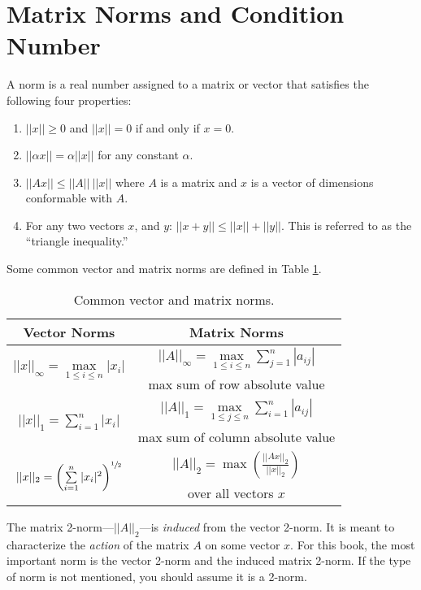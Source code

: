 \section{Matrix Norms and Condition Number}
A norm is a real number assigned to a matrix or vector that satisfies the following four properties:
\begin{enumerate}
\item $||x||\ge 0$ and $||x||=0$ if and only  if $x = 0$.
\item $||\alpha x|| = \alpha ||x||$ for any constant $\alpha$.
\item $||Ax|| \le ||A||\ ||x||$ where $A$ is a matrix and $x$ is a vector of dimensions conformable with $A$.
\item For any two vectors $x$, and $y$: $||x + y|| \le ||x|| + ||y||$.  This is referred to as the ``triangle inequality.''  
\end{enumerate}
Some common vector and matrix norms are defined in Table \ref{tab:matrix-and-vector-norms}.
\begin{table}
\begin{tabular}{| c | c |}
\hline
Vector Norms & Matrix Norms \\ \hline
\multirow{2}{*}{$||x||_{\infty} = \max\limits_{1 \le i \le n} |x_i|$} &  $||A||_{\infty} = \max\limits_{1 \le i \le n} \sum\limits_{j=1}^{n} |a_{ij}|  $ \\ 
  & max sum of row absolute value \\ \hline
\multirow{2}{*}{$||x||_{1} = \sum\limits_{i=1}^{n} |x_{i}|$} & $||A||_1 = \max\limits_{1\le j \le n}\sum\limits_{i=1}^{n} |a_{ij}|$ \\ 
 & max sum of column absolute value \\ \hline
 \multirow{2}{*}{$||x||_2 = \left(\sum\limits_{i=1}^{n} |x_{i}|^2 \right)^{\sfrac{1}{2}}   $} & $||A||_2 = \max\left(\frac{||Ax||_2}{||x||_2}\right) $\\
 &  over all vectors $x$ \\ \hline
\end{tabular}
\caption{Common vector and matrix norms.}
\label{tab:matrix-and-vector-norms}
\end{table}
The matrix 2-norm---$||A||_{2}$---is \emph{induced} from the vector 2-norm.  It is meant to characterize the \emph{action} of the matrix $A$ on some vector $x$.  For this book, the most important norm is the vector 2-norm and the induced matrix 2-norm.  If the type of norm is not mentioned, you should assume it is a 2-norm.

